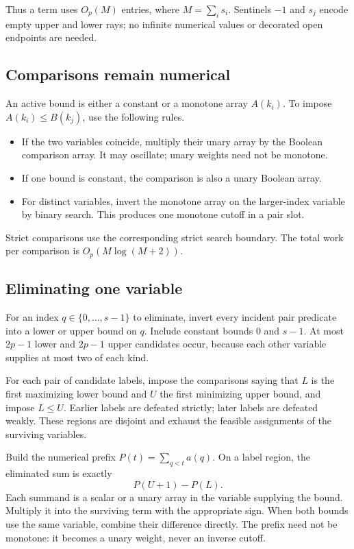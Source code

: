 \documentclass[12pt,a4paper]{article}
\newcommand{\1}{\mathbf1}
\begin{document}
Thus a term uses $O_p(M)$ entries, where $M=\sum_i s_i$.
Sentinels $-1$ and $s_j$ encode empty upper and lower rays; no infinite
numerical values or decorated open endpoints are needed.

\subsection{Comparisons remain numerical}
An active bound is either a constant or a monotone array $A(k_i)$.
To impose $A(k_i)\le B(k_j)$, use the following rules.
\begin{itemize}
\item If the two variables coincide, multiply their unary array by the
Boolean comparison array. It may oscillate; unary weights need not be monotone.
\item If one bound is constant, the comparison is also a unary Boolean array.
\item For distinct variables, invert the monotone array on the larger-index
variable by binary search. This produces one monotone cutoff in a pair slot.
\end{itemize}
Strict comparisons use the corresponding strict search boundary. The
total work per comparison is $O_p(M\log(M+2))$.

\subsection{Eliminating one variable}
For an index $q\in\{0,\ldots,s-1\}$ to eliminate, invert every incident
pair predicate into a lower or upper bound on $q$. Include constant bounds
$0$ and $s-1$. At most $2p-1$ lower and $2p-1$ upper candidates occur,
because each other variable supplies at most two of each kind.

For each pair of candidate labels, impose the comparisons saying that
$L$ is the first maximizing lower bound and $U$ the first minimizing
upper bound, and impose $L\le U$. Earlier labels are defeated strictly;
later labels are defeated weakly. These regions are disjoint and exhaust
the feasible assignments of the surviving variables.

Build the numerical prefix $P(t)=\sum_{q<t}a(q)$. On a label region,
the eliminated sum is exactly
\begin{equation}
                            P(U+1)-P(L).            \label{eq:prefix}
\end{equation}
Each summand is a scalar or a unary array in the variable supplying the
bound. Multiply it into the surviving term with the appropriate sign.
When both bounds use the same variable, combine their difference directly.
The prefix need not be monotone: it becomes a unary weight, never an
inverse cutoff.
\end{document}
